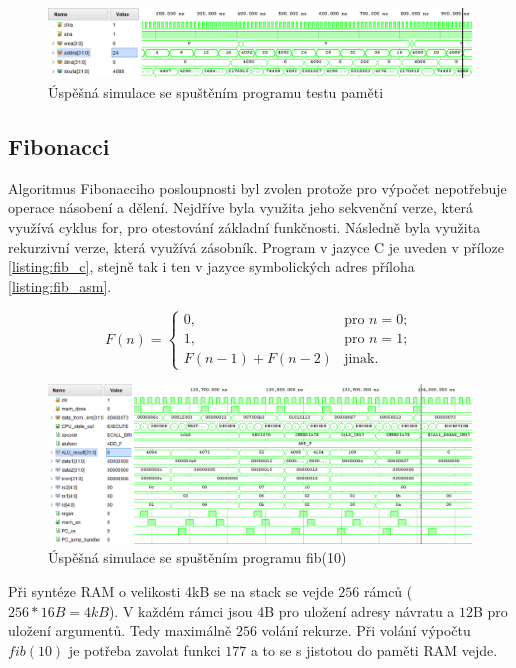 \documentclass[FM,BP]{tulthesis}
\begin{document}
\begin{figure}[h]
    \centering
    \includegraphics[width=\textwidth]{assets/Program_mem_test.png}
    \caption{Úspěšná simulace se spuštěním programu testu paměti}
    \label{img:mem_test_simulace}
\end{figure}

\subsection{Fibonacci}
Algoritmus Fibonacciho posloupnosti byl zvolen protože pro výpočet nepotřebuje operace násobení a dělení. Nejdříve byla využita jeho sekvenční verze, která využívá cyklus for, pro otestování základní funkčnosti. Následně byla využita rekurzivní verze, která využívá zásobník. Program v jazyce C je uveden v příloze \ref{listing:fib_c}, stejně tak i ten v jazyce symbolických adres příloha \ref{listing:fib_asm}. 

\begin{equation}
F(n) = 
\begin{cases}
0, & \text{pro } n = 0; \\
1, & \text{pro } n = 1; \\
F(n−1)+F(n−2) & \text{jinak.}
\end{cases}
\end{equation}

\begin{figure}[h]
    \centering
    \includegraphics[width=\textwidth]{assets/Program_fib(10).png}
    \caption{Úspěšná simulace se spuštěním programu fib(10)}
    \label{img:fib_simulace}
\end{figure}

Při syntéze RAM o velikosti 4kB se na stack se vejde $256$ rámců ($256 * 16B = 4kB$). V každém rámci jsou 4B pro uložení adresy návratu a $12$B pro uložení argumentů. Tedy maximálně $256$ volání rekurze. Při volání výpočtu $fib(10)$ je potřeba zavolat funkci $177$ a to se s jistotou do paměti RAM vejde.
\end{document}
